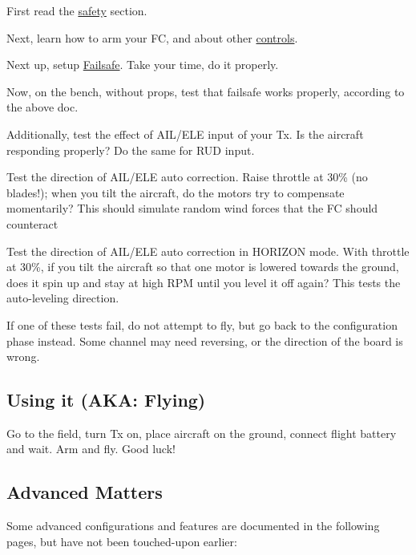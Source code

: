 \begin{DoxyItemize}
\item First read the \hyperlink{Safety_8md}{safety} section.
\item Next, learn how to arm your F\+C, and about other \hyperlink{Controls_8md}{controls}.
\item Next up, setup \hyperlink{Failsafe_8md}{Failsafe}. Take your time, do it properly.
\item Now, on the bench, without props, test that failsafe works properly, according to the above doc.
\item Additionally, test the effect of A\+I\+L/\+E\+L\+E input of your Tx. Is the aircraft responding properly? Do the same for R\+U\+D input.
\item Test the direction of A\+I\+L/\+E\+L\+E auto correction. Raise throttle at 30\% (no blades!); when you tilt the aircraft, do the motors try to compensate momentarily? This should simulate random wind forces that the F\+C should counteract
\item Test the direction of A\+I\+L/\+E\+L\+E auto correction in H\+O\+R\+I\+Z\+O\+N mode. With throttle at 30\%, if you tilt the aircraft so that one motor is lowered towards the ground, does it spin up and stay at high R\+P\+M until you level it off again? This tests the auto-\/leveling direction.
\end{DoxyItemize}

If one of these tests fail, do not attempt to fly, but go back to the configuration phase instead. Some channel may need reversing, or the direction of the board is wrong.

\subsection*{Using it (A\+K\+A\+: Flying)}

Go to the field, turn Tx on, place aircraft on the ground, connect flight battery and wait. Arm and fly. Good luck!

\subsection*{Advanced Matters}

Some advanced configurations and features are documented in the following pages, but have not been touched-\/upon earlier\+:


